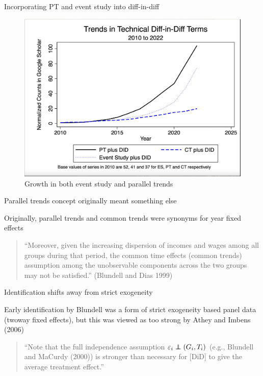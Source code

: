 \documentclass{beamer}
\newcommand\independent{\protect\mathpalette{\protect\independenT}{\perp}}
\def\independenT#1#2{\mathrel{\rlap{$#1#2$}\mkern2mu{#1#2}}}
\begin{document}
\begin{frame}{Incorporating PT and event study into diff-in-diff}

	\begin{figure}
	\caption{Growth in both event study and parallel trends}
	\includegraphics[scale=0.2]{./lecture_includes/espt_3}
	\end{figure}


\end{frame}





\begin{frame}{Parallel trends concept originally meant something else}


 Originally, parallel trends and common trends were synonyms for year fixed effects 
 
 \bigskip
 
	\begin{quote}
	“Moreover, given the increasing dispersion of incomes and wages among all groups during that period, the common time effects (common trends) assumption among the unobservable components across the two groups may not be satisfied.” (Blundell and Dias 1999)
	\end{quote}


\end{frame}

\begin{frame}{Identification shifts away from strict exogeneity}


 Early identification by Blundell was a form of strict exogeneity based panel data (twoway fixed effects), but this was viewed as too strong by Athey and Imbens (2006) 
 
 \bigskip

\begin{quote}
“Note that the full independence assumption $\varepsilon_i \independent(G_i,T_i)$ (e.g., Blundell and MaCurdy (2000)) is stronger than necessary for [DiD] to give the average treatment effect.”
\end{quote}


\end{frame}
\end{document}
